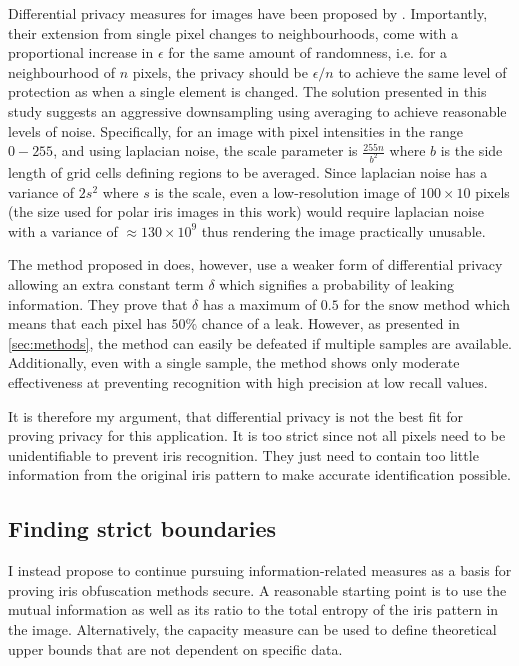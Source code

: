 Differential privacy measures for images have been proposed by \parencite{fan2018image}. Importantly, their extension from single pixel changes to neighbourhoods, come with a proportional increase in $\epsilon$ for the same amount of randomness, i.e. for a neighbourhood of $n$ pixels, the privacy should be $\epsilon/n$ to achieve the same level of protection as when a single element is changed. The solution presented in this study suggests an aggressive downsampling using averaging to achieve reasonable levels of noise. Specifically, for an image with pixel intensities in the range $0-255$, and using laplacian noise, the scale parameter is $\frac{255n}{b^2}$ where $b$ is the side length of grid cells defining regions to be averaged. Since laplacian noise has a variance of $2s^2$ where $s$ is the scale, even a low-resolution image of $100\times 10$ pixels (the size used for polar iris images in this work) would require laplacian noise with a variance of $\approx 130\times 10^9$ thus rendering the image practically unusable.

The method proposed in \parencite{BRENDAN_SNOW} does, however, use a weaker form of differential privacy allowing an extra constant term $\delta$ which signifies a probability of leaking information. They prove that $\delta$ has a maximum of $0.5$ for the snow method which means that each pixel has $50\%$ chance of a leak. However, as presented in \cref{sec:methods}, the method can easily be defeated if multiple samples are available. Additionally, even with a single sample, the method shows only moderate effectiveness at preventing recognition with high precision at low recall values. 

It is therefore my argument, that differential privacy is not the best fit for proving privacy for this application. It is too strict since not all pixels need to be unidentifiable to prevent iris recognition. They just need to contain too little information from the original iris pattern to make accurate identification possible.

\subsection{Finding strict boundaries}
I instead propose to continue pursuing information-related measures as a basis for proving iris obfuscation methods secure. A reasonable starting point is to use the mutual information as well as its ratio to the total entropy of the iris pattern in the image. Alternatively, the capacity measure can be used to define theoretical upper bounds that are not dependent on specific data.

